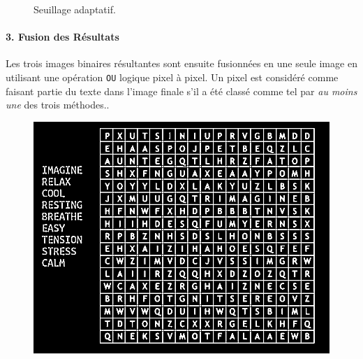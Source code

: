 \documentclass{article}
\begin{document}
\begin{itemize}
\begin{figure}[H]
        \caption{}
      \endminipage
      \caption{Seuillage adaptatif.}
    \end{figure}
\end{itemize}

\paragraph{3. Fusion des Résultats}
Les trois images binaires résultantes sont ensuite fusionnées en une seule image en utilisant une opération \texttt{OU} logique pixel à pixel. Un pixel est considéré comme faisant partie du texte dans l'image finale s'il a été classé comme tel par \textit{au moins une} des trois méthodes..
\begin{figure}[H]
  \centering
      \includegraphics[width=\linewidth]{ressources/1level_1_image_1_06_combined_threshold.png}
      \caption{}
    \endminipage\quad\quad\quad\quad

\end{figure}
\end{document}
